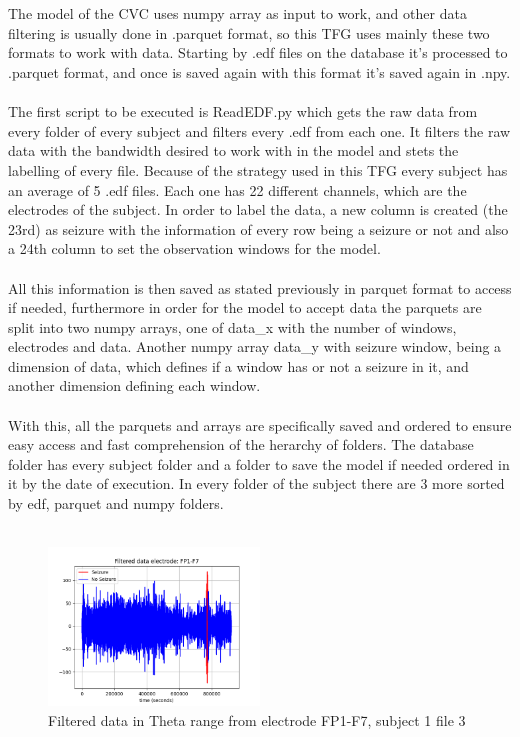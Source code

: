 \\\\
The model of the CVC uses numpy array as input to work, and other data filtering is usually done in .parquet format, so this TFG uses mainly these two formats to work with data. Starting by .edf files on the database it’s processed to .parquet format, and once is saved again with this format it’s saved again in .npy.
\\\\
The first script to be executed is ReadEDF.py which gets the raw data from every folder of every subject and filters every .edf from each one. It filters the raw data with the bandwidth desired to work with in the model and stets the labelling of every file. Because of the strategy used in this TFG every subject has an average of 5 .edf files. Each one has 22 different channels, which are the electrodes of the subject. In order to label the data, a new column is created (the 23rd) as seizure with the information of every row being a seizure or not and also a 24th column to set the observation windows for the model.
\\\\
All this information is then saved as stated previously in parquet format to access if needed, furthermore in order for the model to accept data the parquets are split into two numpy arrays, one of data\_x with the number of windows, electrodes and data. Another numpy array data\_y with seizure window, being a dimension of data, which defines if a window has or not a seizure in it, and another dimension defining each window.
\\\\
With this, all the parquets and arrays are specifically saved and ordered to ensure easy access and fast comprehension of the herarchy of folders. The database folder has every subject folder and a folder to save the model if needed ordered in it by the date of execution. In every folder of the subject there are 3 more sorted by edf, parquet and numpy folders.
\\\\

\begin{figure}[h!]
    \caption{Filtered data in Theta range from electrode FP1-F7, subject 1 file 3}
    \centering
    \includegraphics[width=0.5\textwidth]{img/seizurenoseizure.png}
\end{figure}

